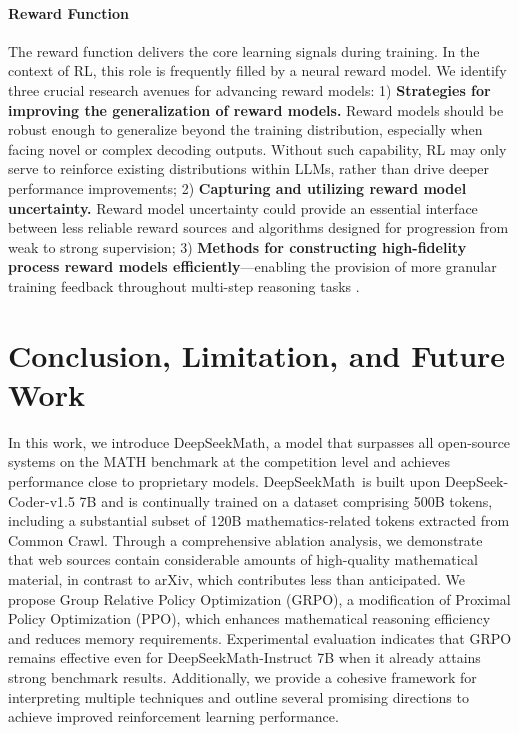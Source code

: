 \begin{itemize}[topsep=0pt]
\begin{itemize}[topsep=0pt]
\paragraph{Reward Function} The reward function delivers the core learning signals during training. In the context of RL, this role is frequently filled by a neural reward model. We identify three crucial research avenues for advancing reward models: 1) \textbf{Strategies for improving the generalization of reward models.} Reward models should be robust enough to generalize beyond the training distribution, especially when facing novel or complex decoding outputs. Without such capability, RL may only serve to reinforce existing distributions within LLMs, rather than drive deeper performance improvements; 2) \textbf{Capturing and utilizing reward model uncertainty.} Reward model uncertainty could provide an essential interface between less reliable reward sources and algorithms designed for progression from weak to strong supervision; 3) \textbf{Methods for constructing high-fidelity process reward models efficiently}—enabling the provision of more granular training feedback throughout multi-step reasoning tasks \citep{lightman2023let,wang2023math}.

\section{Conclusion, Limitation, and Future Work}

In this work, we introduce DeepSeekMath, a model that surpasses all open-source systems on the MATH benchmark at the competition level and achieves performance close to proprietary models. DeepSeekMath~is built upon DeepSeek-Coder-v1.5 7B and is continually trained on a dataset comprising 500B tokens, including a substantial subset of 120B mathematics-related tokens extracted from Common Crawl. Through a comprehensive ablation analysis, we demonstrate that web sources contain considerable amounts of high-quality mathematical material, in contrast to arXiv, which contributes less than anticipated. We propose Group Relative Policy Optimization (GRPO), a modification of Proximal Policy Optimization (PPO), which enhances mathematical reasoning efficiency and reduces memory requirements. Experimental evaluation indicates that GRPO remains effective even for DeepSeekMath-Instruct 7B when it already attains strong benchmark results. Additionally, we provide a cohesive framework for interpreting multiple techniques and outline several promising directions to achieve improved reinforcement learning performance.


\end{itemize}
\end{itemize}

